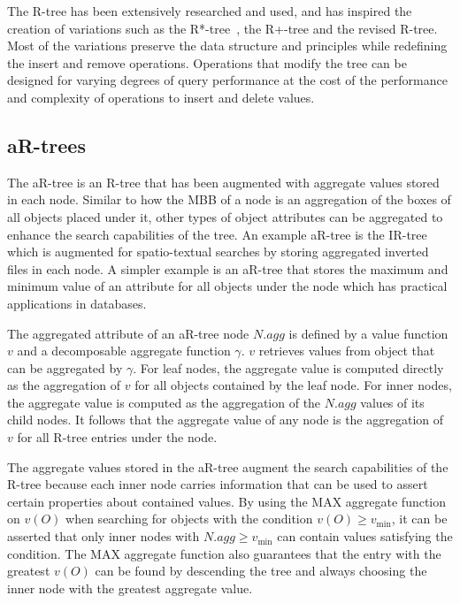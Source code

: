 The R-tree has been extensively researched and used, and has inspired the creation of variations such as the R*-tree~\cite{beckmann1990r}, the R+-tree and the revised R-tree. Most of the variations preserve the data structure and principles while redefining the insert and remove operations. Operations that modify the tree can be designed for varying degrees of query performance at the cost of the performance and complexity of operations to insert and delete values.

\subsection{aR-trees}

The aR-tree is an R-tree that has been augmented with aggregate values stored in each node. Similar to how the MBB of a node is an aggregation of the boxes of all objects placed under it, other types of object attributes can be aggregated to enhance the search capabilities of the tree. An example aR-tree is the IR-tree~\cite{li2010ir} which is augmented for spatio-textual searches by storing aggregated inverted files in each node. A simpler example is an aR-tree that stores the maximum and minimum value of an attribute for all objects under the node which has practical applications in databases.

The aggregated attribute of an aR-tree node \(N.agg\) is defined by a value function \(v\) and a decomposable aggregate function \(\gamma\). \(v\) retrieves values from object that can be aggregated by \(\gamma\). For leaf nodes, the aggregate value is computed directly as the aggregation of \(v\) for all objects contained by the leaf node. For inner nodes, the aggregate value is computed as the aggregation of the \(N.agg\) values of its child nodes. It follows that the aggregate value of any node is the aggregation of \(v\) for all R-tree entries under the node.

The aggregate values stored in the aR-tree augment the search capabilities of the R-tree because each inner node carries information that can be used to assert certain properties about contained values. By using the MAX aggregate function on \(v(O)\) when searching for objects with the condition \(v(O) \geq v_{\min}\), it can be asserted that only inner nodes with \(N.agg \geq v_{\min}\) can contain values satisfying the condition. The MAX aggregate function also guarantees that the entry with the greatest \(v(O)\) can be found by descending the tree and always choosing the inner node with the greatest aggregate value.

